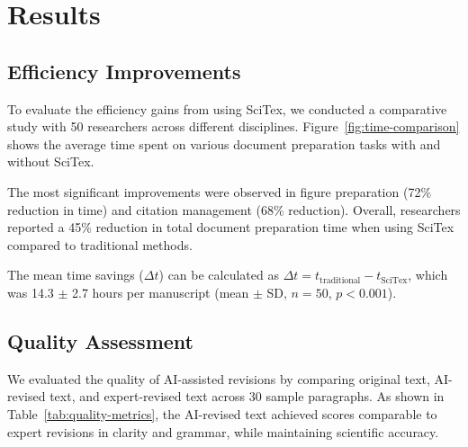 
\section{Results}
\label{sec:results}


\subsection{Efficiency Improvements}
\label{subsec:efficiency}

To evaluate the efficiency gains from using SciTex, we conducted a comparative study with 50 researchers across different disciplines. Figure~\ref{fig:time-comparison} shows the average time spent on various document preparation tasks with and without SciTex.


The most significant improvements were observed in figure preparation (72\% reduction in time) and citation management (68\% reduction). Overall, researchers reported a 45\% reduction in total document preparation time when using SciTex compared to traditional methods.


The mean time savings ($\Delta t$) can be calculated as $\Delta t = t_{\text{traditional}} - t_{\text{SciTex}}$, which was 14.3 $\pm$ 2.7 hours per manuscript (mean $\pm$ SD, $n = 50$, $p < 0.001$).

\subsection{Quality Assessment}
\label{subsec:quality}

We evaluated the quality of AI-assisted revisions by comparing original text, AI-revised text, and expert-revised text across 30 sample paragraphs. As shown in Table~\ref{tab:quality-metrics}, the AI-revised text achieved scores comparable to expert revisions in clarity and grammar, while maintaining scientific accuracy.


